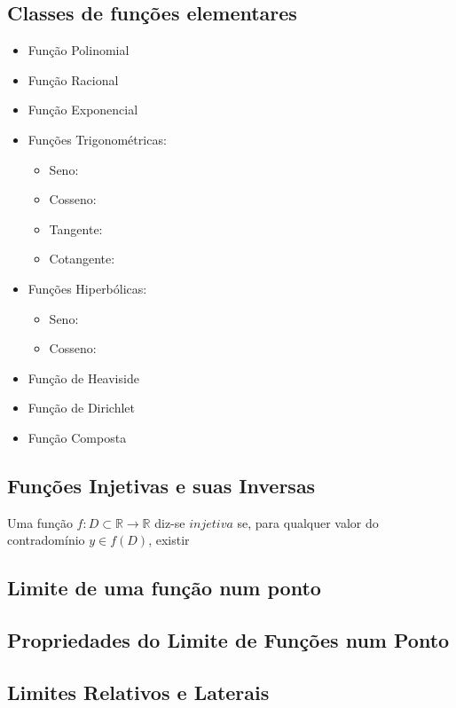 \documentclass[11pt]{article}
\begin{document}
\subsection{Classes de funções elementares}

\begin{itemize}
    \item Função Polinomial
    \item Função Racional
    \item Função Exponencial
    \item Funções Trigonométricas:
        \begin{itemize}[topsep=0pt]
            \item Seno:
            \item Cosseno:
            \item Tangente:
            \item Cotangente:
        \end{itemize}
    \item Funções Hiperbólicas:
        \begin{itemize}[topsep=0pt]
            \item Seno:
            \item Cosseno:
        \end{itemize}
    \item Função de Heaviside
    \item Função de Dirichlet
    \item Função Composta
\end{itemize}

\subsection{Funções Injetivas e suas Inversas}

Uma função $f:D\subset\mathbb{R}\rightarrow\mathbb{R}$ diz-se $injetiva$ se, para qualquer valor do contradomínio $y \in f(D)$, existir 

\subsection{Limite de uma função num ponto}

\subsection{Propriedades do Limite de Funções num Ponto}

\subsection{Limites Relativos e Laterais}
\end{document}
